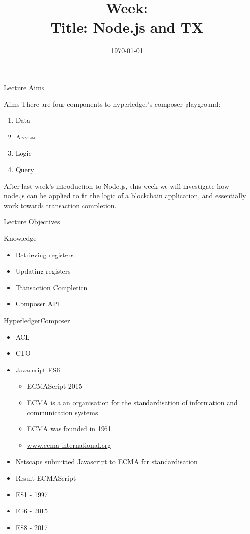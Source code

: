 \documentclass[pdf,table]{beamer}
\title[\moduleCode:L\theweek]{\moduleTitle \\ Week: \theweek \\ Title: Node.js and TX}
\institute[]{\texttt{[image: ../../../logo/mdxSmall]} \\ Middlesex University, \\Dept. of Computer Science, \\London}
\author[\textcopyright \email]{\moduleLeader}
\date{\today}
\begin{document}
	\begin{frame}
		\titlepage
	\end{frame}



	\begin{frame}{Lecture Aims}
		\begin{block}{Aims}
			There are four components to hyperledger's  composer playground:
			\begin{enumerate}
				\item Data
				\item Access
				\item Logic
				\item Query
			\end{enumerate}
			After last week's introduction to Node.js, this week we will investigate how node.js can be applied to fit the logic of a blockchain application, and essentially work towards transaction completion.
		\end{block}
	\end{frame}

	\begin{frame}{Lecture Objectives}
		\begin{block}{Knowledge}
			\begin{itemize}
				\item Retrieving registers
				\item Updating registers
				\item Transaction Completion
				\item Composer API
			\end{itemize}	
		\end{block}
	\end{frame}

\begin{frame}{Hyperledger}{Composer}
	\begin{itemize}
		\item ACL
		\item CTO
		\item Javascript ES6
			\begin{itemize}
				\item ECMAScript 2015
				\item ECMA is a an organisation for the standardisation of information and communication systems
				\item ECMA was founded in 1961
				\item \url{www.ecma-international.org}
			\end{itemize}
		\item Netscape submitted Javascript to ECMA for standardisation
		\item Result ECMAScript
		\item ES1 - 1997
		\item ES6 - 2015
		\item ES8 - 2017
	\end{itemize}
\end{frame}
\end{document}
